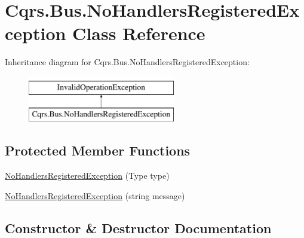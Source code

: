 \hypertarget{classCqrs_1_1Bus_1_1NoHandlersRegisteredException}{}\section{Cqrs.\+Bus.\+No\+Handlers\+Registered\+Exception Class Reference}
\label{classCqrs_1_1Bus_1_1NoHandlersRegisteredException}
Inheritance diagram for Cqrs.\+Bus.\+No\+Handlers\+Registered\+Exception\+:\begin{figure}[H]
\begin{center}
\leavevmode
\includegraphics[height=2.000000cm]{classCqrs_1_1Bus_1_1NoHandlersRegisteredException}
\end{center}
\end{figure}
\subsection*{Protected Member Functions}
\begin{DoxyCompactItemize}
\item 
\hyperlink{classCqrs_1_1Bus_1_1NoHandlersRegisteredException_ae0a819bb83ab2518e5abbfd2a67376ad}{No\+Handlers\+Registered\+Exception} (Type type)
\item 
\hyperlink{classCqrs_1_1Bus_1_1NoHandlersRegisteredException_a7625d1c076a9d942025d1530729f7571}{No\+Handlers\+Registered\+Exception} (string message)
\end{DoxyCompactItemize}


\subsection{Constructor \& Destructor Documentation}
\mbox{\label{classCqrs_1_1Bus_1_1NoHandlersRegisteredException_ae0a819bb83ab2518e5abbfd2a67376ad}} 
